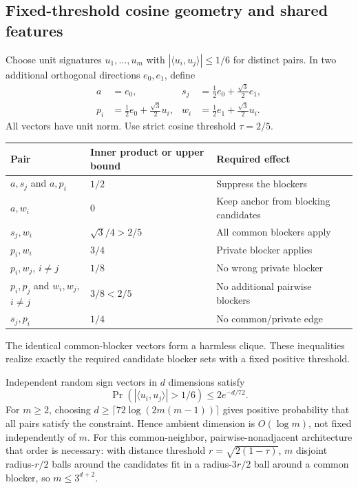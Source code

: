 \documentclass[11pt,a4paper]{article}
\theoremstyle{definition}\newtheorem{definition}[theorem]{Definition}
\begin{document}
\subsection{Fixed-threshold cosine geometry and shared features}
Choose unit signatures $u_1,\ldots,u_m$ with $|\langle u_i,u_j\rangle|\le1/6$ for distinct pairs. In two additional orthogonal directions $e_0,e_1$, define
\begin{align*}
 a&=e_0,&s_j&=\tfrac12e_0+\tfrac{\sqrt3}2e_1,\\
 p_i&=\tfrac12e_0+\tfrac{\sqrt3}2u_i,&
 w_i&=\tfrac12e_1+\tfrac{\sqrt3}2u_i.
\end{align*}
All vectors have unit norm. Use strict cosine threshold $\tau=2/5$.
\begin{center}\small
\begin{tabular}{lll}\toprule
Pair & Inner product or upper bound & Required effect\\\midrule
$a,s_j$ and $a,p_i$ & $1/2$ & Suppress the blockers\\
$a,w_i$ & $0$ & Keep anchor from blocking candidates\\
$s_j,w_i$ & $\sqrt3/4>2/5$ & All common blockers apply\\
$p_i,w_i$ & $3/4$ & Private blocker applies\\
$p_i,w_j$, $i\ne j$ & $1/8$ & No wrong private blocker\\
$p_i,p_j$ and $w_i,w_j$, $i\ne j$ & $3/8<2/5$ & No additional pairwise blockers\\
$s_j,p_i$ & $1/4$ & No common/private edge\\\bottomrule
\end{tabular}
\end{center}
The identical common-blocker vectors form a harmless clique. These inequalities realize exactly the required candidate blocker sets with a fixed positive threshold.

Independent random sign vectors in $d$ dimensions satisfy
\[
 \Pr(|\langle u_i,u_j\rangle|>1/6)\le2e^{-d/72}.
\]
For $m\ge2$, choosing $d\ge\lceil72\log(2m(m-1))\rceil$ gives positive probability that all pairs satisfy the constraint. Hence ambient dimension is $O(\log m)$, not fixed independently of $m$. For this common-neighbor, pairwise-nonadjacent architecture that order is necessary: with distance threshold $r=\sqrt{2(1-\tau)}$, $m$ disjoint radius-$r/2$ balls around the candidates fit in a radius-$3r/2$ ball around a common blocker, so $m\le3^{d+2}$.
\end{document}
